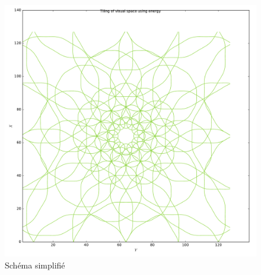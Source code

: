 \begin{figure}[th]
\centering
\includegraphics[scale=0.8]{Figures/logpol_energy_filter}
\decoRule %
\caption[Figure]{Schéma simplifié}
\label{fig:energy_filter}
\end{figure}

